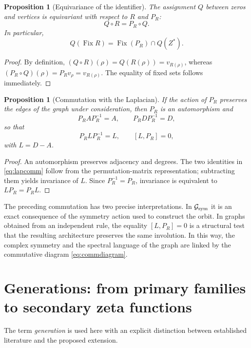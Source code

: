 \documentclass[11pt]{amsart}
\newtheorem{proposition}[theorem]{Proposition}
\theoremstyle{definition}
\theoremstyle{remark}
\begin{document}
\begin{proposition}[Equivariance of the identifier]\label{prop:equivariance}
The assignment $Q$ between zeros and vertices is equivariant with respect to $R$ and $P_R$:
\begin{equation}\label{eq:commdiagram}
Q\circ R=P_R\circ Q.
\end{equation}
In particular,
\[
Q(\operatorname{Fix}R)=\operatorname{Fix}(P_R)\cap Q(Z^*).
\]
\end{proposition}

\begin{proof}
By definition, $(Q\circ R)(\rho)=Q(R(\rho))=v_{R(\rho)}$, whereas $(P_R\circ Q)(\rho)=P_Rv_{\rho}=v_{R(\rho)}$. The equality of fixed sets follows immediately.
\end{proof}

\begin{proposition}[Commutation with the Laplacian]\label{prop:lapcomm}
If the action of $P_R$ preserves the edges of the graph under consideration, then $P_R$ is an automorphism and
\begin{equation}\label{eq:lapcomm}
P_RAP_R^{-1}=A,\qquad P_RDP_R^{-1}=D,
\end{equation}
so that
\begin{equation}
P_RLP_R^{-1}=L,\qquad [L,P_R]=0,
\end{equation}
with $L=D-A$.
\end{proposition}

\begin{proof}
An automorphism preserves adjacency and degrees. The two identities in \eqref{eq:lapcomm} follow from the permutation-matrix representation; subtracting them yields invariance of $L$. Since $P_R^{-1}=P_R$, invariance is equivalent to $LP_R=P_RL$.
\end{proof}

The preceding commutation has two precise interpretations. In $\mathcal G_{\rm sym}$ it is an exact consequence of the symmetry action used to construct the orbit. In graphs obtained from an independent rule, the equality $[L,P_R]=0$ is a structural test that the resulting architecture preserves the same involution. In this way, the complex symmetry and the spectral language of the graph are linked by the commutative diagram \eqref{eq:commdiagram}.

\section{Generations: from primary families to secondary zeta functions}
The term \emph{generation} is used here with an explicit distinction between established literature and the proposed extension.
\end{document}
